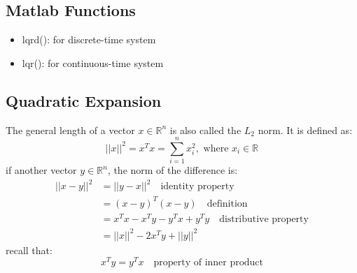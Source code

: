 \documentclass[10pt,a4paper,oneside]{article}
\begin{document}
\subsection{Matlab Functions}
\begin{itemize}
	\item lqrd(): for discrete-time system
	\item lqr(): for continuous-time system
\end{itemize}

\subsection{Quadratic Expansion}
The general length of a vector $x \in \mathbb{R}^n$ is also called the $L_2$ norm. It is defined as:
\[
||x||^2 = x^T x = \sum_{i=1}^{n} x_i ^2, \text{ where } x_i \in \mathbb{R} 
\]
if another vector $y \in \mathbb{R}^n$, the norm of the difference is:
\begin{align*}
||x-y||^2 &= ||y-x||^2 \quad \text{identity property}\\
& = (x-y)^T (x-y) \quad \text{definition}\\
& = x^Tx - x^Ty - y^Tx + y^Ty \quad \text{distributive property}\\
& = ||x||^2 -2x^Ty +||y||^2
\end{align*}
recall that:
\[
x^Ty = y^Tx \quad \text{property of inner product}
\]
\end{document}
